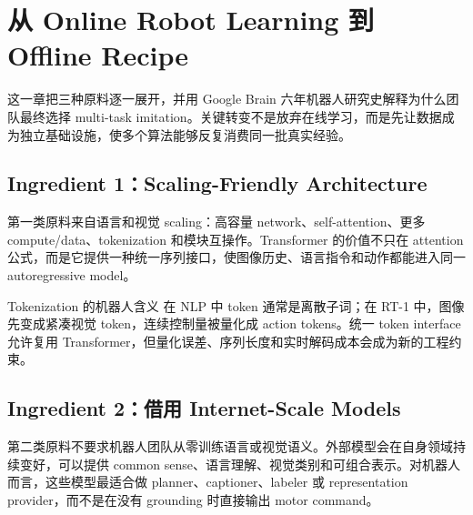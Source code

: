 \section{从 Online Robot Learning 到 Offline Recipe}

这一章把三种原料逐一展开，并用 Google Brain 六年机器人研究史解释为什么团队最终选择 multi-task imitation。关键转变不是放弃在线学习，而是先让数据成为独立基础设施，使多个算法能够反复消费同一批真实经验。

\subsection{Ingredient 1：Scaling-Friendly Architecture}

第一类原料来自语言和视觉 scaling：高容量 network、self-attention、更多 compute/data、tokenization 和模块互操作。Transformer 的价值不只在 attention 公式，而是它提供一种统一序列接口，使图像历史、语言指令和动作都能进入同一 autoregressive model。


\begin{knowledgebox}{Tokenization 的机器人含义}
在 NLP 中 token 通常是离散子词；在 RT-1 中，图像先变成紧凑视觉 token，连续控制量被量化成 action tokens。统一 token interface 允许复用 Transformer，但量化误差、序列长度和实时解码成本会成为新的工程约束。
\end{knowledgebox}

\subsection{Ingredient 2：借用 Internet-Scale Models}

第二类原料不要求机器人团队从零训练语言或视觉语义。外部模型会在自身领域持续变好，可以提供 common sense、语言理解、视觉类别和可组合表示。对机器人而言，这些模型最适合做 planner、captioner、labeler 或 representation provider，而不是在没有 grounding 时直接输出 motor command。



